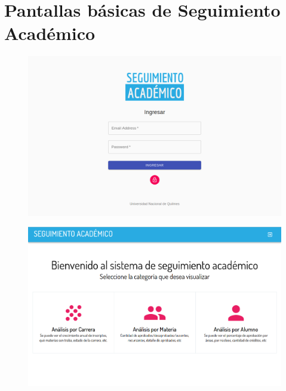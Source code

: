 \section{Pantallas básicas de Seguimiento Académico}

\begin{figure}[!htbp]
  \centering
    \includegraphics[scale=0.3]{images/seguimiento-academico/sa-login.png}
  \label{fig:sa-login}
\end{figure}

\begin{figure}[!htbp]
  \centering
    \includegraphics[scale=0.3]{images/seguimiento-academico/sa-home.png}
  \label{fig:sa-home}
\end{figure}

